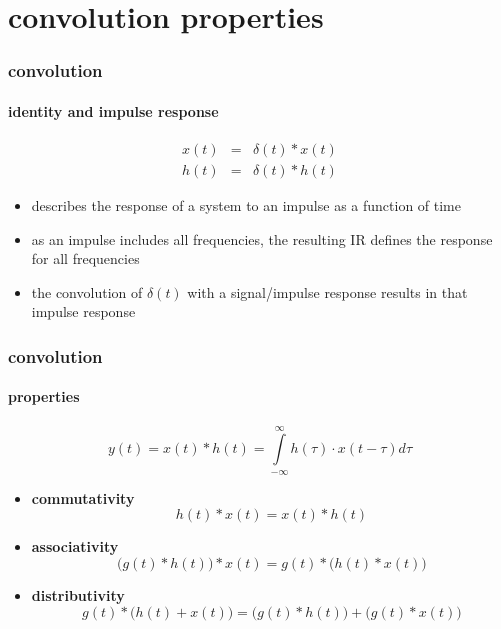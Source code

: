 \section[conv. prop.]{convolution properties}
\begin{frame}\frametitle{convolution}\framesubtitle{identity and impulse response}
    \begin{eqnarray*}
        x(t) &=& \delta(t)\ast x(t) \\
        h(t) &=& \delta(t)\ast h(t) 
    \end{eqnarray*}

    \bigskip
    \begin{itemize}
        \item<2->   describes the response of a system to an impulse as a function of time
        \smallskip
        \item<3->   as an impulse includes all frequencies, the resulting IR defines the response for all frequencies
        \smallskip
        \item<4->   the convolution of $\delta(t)$ with a signal/impulse response results in that impulse response
    \end{itemize}
\end{frame}
    
	\begin{frame}\frametitle{convolution}\framesubtitle{properties}
		\begin{equation*}
			y(t) = x(t) \ast h(t) = \int\limits_{-\infty}^{\infty}{h(\tau)\cdot x(t-\tau)} d\tau
		\end{equation*}
		\begin{itemize}
			\item	\textbf{commutativity}
				\begin{equation*}
					h(t) \ast x(t)	= x(t) \ast h(t)
				\end{equation*}
			\pause
			\item	\textbf{associativity}
				\begin{equation*}
					\big(g(t) \ast h(t)\big) \ast x(t) = g(t) \ast \big(h(t) \ast x(t)\big)
				\end{equation*}
			\pause
			\item	\textbf{distributivity}
				\begin{equation*}
					g(t) \ast \big(h(t) + x(t)\big) = \big(g(t) \ast h(t)\big) + \big(g(t) \ast x(t)\big)
				\end{equation*}
		\end{itemize}
\end{frame}

